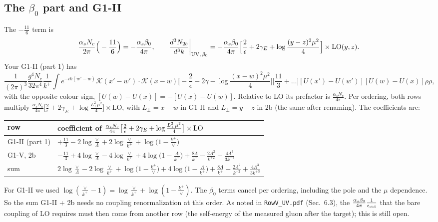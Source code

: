 \documentclass[10pt]{article}
\numberwithin{equation}{section}
\newcommand{\KK}{\mathcal K}
\begin{document}
\subsection{The \texorpdfstring{$\beta_0$}{beta0} part and G1-II}\label{sec:beta}
The $-\frac{11}{6}$ term is
\begin{equation}
\frac{\alpha_sN_c}{2\pi}\Big(-\frac{11}{6}\Big)=-\frac{\alpha_s\beta_0}{4\pi},\qquad
\frac{d^{3}N_{2b}}{d^{3}k}\bigg|_{\rm UV,\,\beta_0}=-\frac{\alpha_s\beta_0}{4\pi}\Big[\frac2\epsilon+2\gamma_E+\log\frac{(y-z)^2\mu^2}{4}\Big]\times{\rm LO}(y,z).
\end{equation}
Your G1-II (part 1) has
\begin{equation*}
\frac{1}{(2\pi)^{3}}\frac{g^{4}N_{c}}{32\pi^{4}}\frac{1}{k^{+}}\int e^{-ik(w'-w)}\KK(x'-w')\cdot\KK(x-w)\Big[-\frac{2}{\epsilon}-2\gamma-\log\frac{(x-w)^{2}\mu^{2}}{4}\Big]\Big[\frac{11}{3}+\dots\Big][U(x')-U(w')][U(w)-U(x)]\rho\rho,
\end{equation*}
with the opposite colour sign, $[U(w)-U(x)]=-[U(x)-U(w)]$. Relative to LO its prefactor is $\frac{\alpha_sN_c}{4\pi}$. Per ordering, both rows multiply $\frac{\alpha_sN_c}{4\pi}\big[\frac2\epsilon+2\gamma_E+\log\frac{L_\perp^2\mu^2}{4}\big]\times$LO, with $L_\perp=x-w$ in G1-II and $L_\perp=y-z$ in 2b (the same after renaming). The coefficients are:
\begin{center}
\begin{tabular}{@{}l l@{}}
row & coefficient of $\frac{\alpha_sN_c}{4\pi}\big[\frac2\epsilon+2\gamma_E+\log\frac{L_\perp^2\mu^2}{4}\big]\times{\rm LO}$\\ \hline
G1-II (part 1) & $+\frac{11}{3}-2\log\frac\vee\Lambda+2\log\frac\vee{k^+}+\log\big(1-\frac{k^+}\vee\big)$\\
G1-V, 2b & $-\frac{11}{3}+4\log\frac\vee\Lambda-4\log\frac\vee{k^+}+4\log\big(1-\frac\Lambda{k^+}\big)+\frac{8\Lambda}{k^+}-\frac{2\Lambda^2}{k^{+2}}+\frac{4\Lambda^3}{3k^{+3}}$\\
sum & $2\log\frac\vee\Lambda-2\log\frac\vee{k^+}+\log\big(1-\frac{k^+}\vee\big)+4\log\big(1-\frac\Lambda{k^+}\big)+\frac{8\Lambda}{k^+}-\frac{2\Lambda^2}{k^{+2}}+\frac{4\Lambda^3}{3k^{+3}}$\\
\end{tabular}
\end{center}
For G1-II we used $\log(\frac\vee{k^+}-1)=\log\frac\vee{k^+}+\log(1-\frac{k^+}\vee)$. The $\beta_0$ terms cancel per ordering, including the pole and the $\mu$ dependence. So the sum G1-II + 2b needs no coupling renormalization at this order. As noted in \texttt{RowV\_UV.pdf} (Sec.~6.3), the $\frac{\alpha_s\beta_0}{4\pi}\frac1{\epsilon_{\rm std}}$ that the bare coupling of LO requires must then come from another row (the self-energy of the measured gluon after the target); this is still open.
\end{document}
